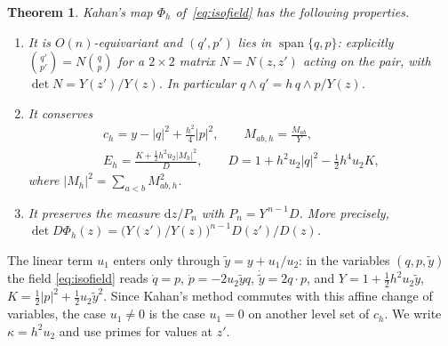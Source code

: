 \documentclass[11pt,a4paper]{article}
\newtheorem{theorem}{Theorem}[section]
\theoremstyle{definition}
\theoremstyle{remark}
\newcommand{\dd}{\mathrm{d}}
\DeclareMathOperator{\spn}{span}
\begin{document}
\begin{theorem}\label{thm:isotropic}
Kahan's map $\Phi_h$ of~\eqref{eq:isofield} has the following properties.
\begin{enumerate}[label=(\alph*)]
\item It is $O(n)$-equivariant and $(q',p')$ lies in $\spn\{q,p\}$: explicitly
  $\binom{q'}{p'}=N\binom{q}{p}$ for a $2\times2$ matrix $N=N(z,z')$ acting on the pair, with
  $\det N=Y(z')/Y(z)$. In particular $q\wedge q'=h\,q\wedge p/Y(z)$.
\item It conserves
\begin{gather*}
c_h=y-\lvert q\rvert^2+\frac{h^2}{4}\lvert p\rvert^2,\qquad
M_{ab,h}=\frac{M_{ab}}{Y},\\
E_h=\frac{K+\frac12h^2u_2\lvert M_h\rvert^2}{D},\qquad D=1+h^2u_2\lvert q\rvert^2-\frac12h^4u_2K,
\end{gather*}
  where $\lvert M_h\rvert^2=\sum_{a<b}M_{ab,h}^2$.
\item It preserves the measure $\dd z/P_n$ with $P_n=Y^{\,n-1}D$. More precisely,
  $\det D\Phi_h(z)=\big(Y(z')/Y(z)\big)^{n-1}D(z')/D(z)$.
\end{enumerate}
\end{theorem}

The linear term $u_1$ enters only through $\tilde y=y+u_1/u_2$: in the variables $(q,p,\tilde y)$ the field
\eqref{eq:isofield} reads $\dot q=p$, $\dot p=-2u_2\tilde yq$, $\dot{\tilde y}=2q\cdot p$, and
$Y=1+\frac12h^2u_2\tilde y$, $K=\frac12\lvert p\rvert^2+\frac12u_2\tilde y^2$. Since Kahan's method commutes with
this affine change of variables, the case $u_1\ne0$ is the case $u_1=0$ on another level set of $c_h$. We
write $\kappa=h^2u_2$ and use primes for values at $z'$.
\end{document}
